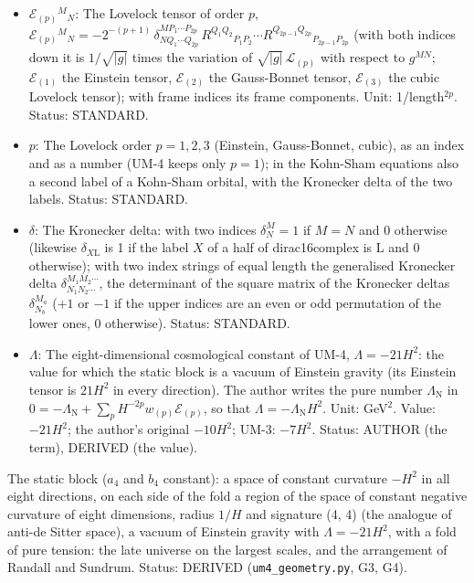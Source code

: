\documentclass[
  10pt,
]{article}
\begin{document}
\begin{itemize}
  \(\kappa\lambda_{\mathrm{F}} = 12H\) of the fold; in UM-4 a free
  parameter, bounded from below by the propagation of the gauge fields
  in the bulk. Unit: GeV (1/length). Value: \(H > 2534\) GeV, about 2.5
  TeV (from the invisible width of the Z boson). Status: AUTHOR.
\item
  \(\mathcal{E}_{(p)}{}^M{}_N\): The Lovelock tensor of order \(p\),
  \(\mathcal{E}_{(p)}{}^M{}_N = -2^{-(p+1)}\,\delta^{MP_1\cdots P_{2p}}_{NQ_1\cdots Q_{2p}}\,R^{Q_1Q_2}{}_{P_1P_2}\cdots R^{Q_{2p-1}Q_{2p}}{}_{P_{2p-1}P_{2p}}\)
  (with both indices down it is \(1/\sqrt{\lvert g\rvert}\) times the
  variation of \(\sqrt{\lvert g\rvert}\,\mathcal{L}_{(p)}\) with respect
  to \(g^{MN}\); \(\mathcal{E}_{(1)}\) the Einstein tensor,
  \(\mathcal{E}_{(2)}\) the Gauss-Bonnet tensor, \(\mathcal{E}_{(3)}\)
  the cubic Lovelock tensor); with frame indices its frame components.
  Unit: 1/length\(^{2p}\). Status: STANDARD.
\item
  \(p\): The Lovelock order \(p = 1, 2, 3\) (Einstein, Gauss-Bonnet,
  cubic), as an index and as a number (UM-4 keeps only \(p = 1\)); in
  the Kohn-Sham equations also a second label of a Kohn-Sham orbital,
  with the Kronecker delta of the two labels. Status: STANDARD.
\item
  \(\delta\): The Kronecker delta: with two indices \(\delta^M_N = 1\)
  if \(M = N\) and 0 otherwise (likewise \(\delta_{X\mathrm{L}}\) is 1
  if the label \(X\) of a half of dirac16complex is L and 0 otherwise);
  with two index strings of equal length the generalised Kronecker delta
  \(\delta^{M_1M_2\cdots}_{N_1N_2\cdots}\), the determinant of the
  square matrix of the Kronecker deltas \(\delta^{M_a}_{N_b}\) (\(+1\)
  or \(-1\) if the upper indices are an even or odd permutation of the
  lower ones, 0 otherwise). Status: STANDARD.
\item
  \(\Lambda\): The eight-dimensional cosmological constant of UM-4,
  \(\Lambda = -21H^2\): the value for which the static block is a vacuum
  of Einstein gravity (its Einstein tensor is \(21H^2\) in every
  direction). The author writes the pure number \(\Lambda_{\mathrm{N}}\)
  in
  \(0 = -\Lambda_{\mathrm{N}} + \sum_p H^{-2p}w_{(p)}\mathcal{E}_{(p)}\),
  so that \(\Lambda = -\Lambda_{\mathrm{N}}H^2\). Unit: GeV\(^2\).
  Value: \(-21H^2\); the author's original \(-10H^2\); UM-3: \(-7H^2\).
  Status: AUTHOR (the term), DERIVED (the value).
\end{itemize}

The static block (\(a_4\) and \(b_4\) constant): a space of constant
curvature \(-H^2\) in all eight directions, on each side of the fold a
region of the space of constant negative curvature of eight dimensions,
radius \(1/H\) and signature (4, 4) (the analogue of anti-de Sitter
space), a vacuum of Einstein gravity with \(\Lambda = -21H^2\), with a
fold of pure tension: the late universe on the largest scales, and the
arrangement of Randall and Sundrum. Status: DERIVED
(\texttt{um4\_geometry.py}, G3, G4).
\end{document}
